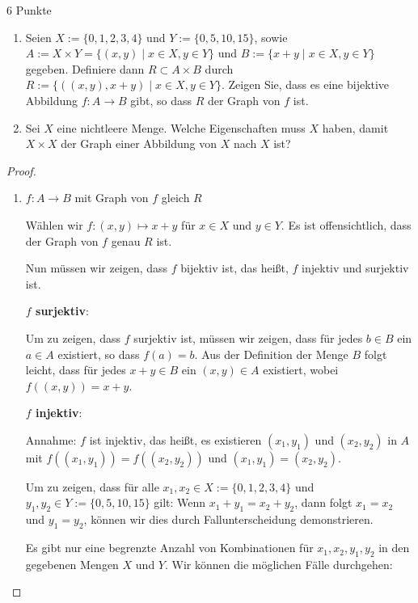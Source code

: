 \documentclass{../problemset}
\begin{document}
\pagebreak

\begin{problem}[Graphen]{6 Punkte}
\begin{enumerate}
	\item Seien $X := \{0, 1, 2, 3, 4\}$ und $Y := \{0, 5, 10, 15\}$, sowie $A := X \times Y = \{(x, y) \mid x \in X, y \in Y\}$ und $B := \{x + y \mid x \in X, y \in Y\}$ gegeben. Definiere dann $R \subset A \times B$ durch $R := \{((x, y), x + y) \mid x \in X, y \in Y\}$.
	      Zeigen Sie, dass es eine bijektive Abbildung $f : A \to B$ gibt, so dass $R$ der Graph von $f$ ist.

	\item Sei $X$ eine nichtleere Menge. Welche Eigenschaften muss $X$ haben, damit $X \times X$ der Graph einer Abbildung von $X$ nach $X$ ist?

\end{enumerate}

\begin{proof} $ $
	\begin{enumerate}
		\item $f: A \rightarrow B$ mit Graph von $f$ gleich $R$

		      Wählen wir \(f: (x, y) \mapsto x + y\) für \(x \in X\) und \(y \in Y\).
		      Es ist offensichtlich, dass der Graph von \(f\) genau \(R\) ist.

		      Nun müssen wir zeigen, dass \(f\) bijektiv ist, das heißt, \(f\) injektiv und surjektiv ist.

		      \textbf{\(f\) surjektiv}:

		      Um zu zeigen, dass \(f\) surjektiv ist, müssen wir zeigen, dass für jedes \(b \in B\) ein \(a \in A\) existiert, so dass \(f(a) = b\).
		      Aus der Definition der Menge \(B\) folgt leicht, dass für jedes \(x + y \in B\) ein \((x, y) \in A\) existiert, wobei \(f((x, y)) = x + y\).

		      \textbf{\(f\) injektiv}:

		      Annahme: \(f\) ist injektiv, das heißt, es existieren \((x_1, y_1)\) und \((x_2, y_2)\) in \(A\) mit \(f((x_1, y_1)) = f((x_2, y_2))\) und \((x_1, y_1) = (x_2, y_2)\).

		      Um zu zeigen, dass für alle \(x_1, x_2 \in X := \{0, 1, 2, 3, 4\}\) und \(y_1, y_2 \in Y := \{0, 5, 10, 15\}\) gilt: Wenn \(x_1 + y_1 = x_2 + y_2\), dann folgt \(x_1 = x_2\) und \(y_1 = y_2\), können wir dies durch Fallunterscheidung demonstrieren.

		      Es gibt nur eine begrenzte Anzahl von Kombinationen für \(x_1, x_2, y_1, y_2\) in den gegebenen Mengen \(X\) und \(Y\). Wir können die möglichen Fälle durchgehen:


\end{enumerate}
\end{proof}
\end{problem}
\end{document}
